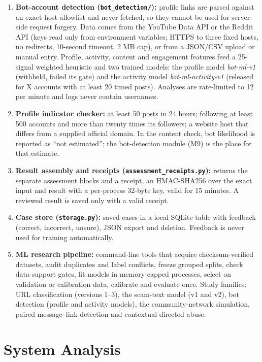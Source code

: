 \begin{enumerate}[label=\textbf{M\arabic*}, leftmargin=1.2cm]
\item \textbf{Bot-account detection (\texttt{bot\_detection/}):} profile links are parsed against an exact host allowlist and never fetched, so they cannot be used for server-side request forgery. Data comes from the YouTube Data API or the Reddit API (keys read only from environment variables; HTTPS to three fixed hosts, no redirects, 10-second timeout, 2 MB cap), or from a JSON/CSV upload or manual entry. Profile, activity, content and engagement features feed a 25-signal weighted heuristic and two trained models: the profile model \emph{bot-ml-v1} (withheld, failed its gate) and the activity model \emph{bot-ml-activity-v1} (released for X accounts with at least 20 timed posts). Analyses are rate-limited to 12 per minute and logs never contain usernames.
\item \textbf{Profile indicator checker:} at least 50 posts in 24 hours; following at least 500 accounts and more than twenty times its followers; a website host that differs from a supplied official domain. In the content check, bot likelihood is reported as ``not estimated''; the bot-detection module (M9) is the place for that estimate.
\item \textbf{Result assembly and receipts (\texttt{assessment\_receipts.py}):} returns the separate assessment blocks and a receipt, an HMAC-SHA256 \cite{hmac} over the exact input and result with a per-process 32-byte key, valid for 15 minutes. A reviewed result is saved only with a valid receipt.
\item \textbf{Case store (\texttt{storage.py}):} saved cases in a local SQLite table with feedback (correct, incorrect, unsure), JSON export and deletion. Feedback is never used for training automatically.
\item \textbf{ML research pipeline:} command-line tools that acquire checksum-verified datasets, audit duplicates and label conflicts, freeze grouped splits, check data-support gates, fit models in memory-capped processes, select on validation or calibration data, calibrate and evaluate once. Study families: URL classification (versions 1--3), the scam-text model (v1 and v2), bot detection (profile and activity models), the community-network simulation, paired message--link detection and contextual directed abuse.
\end{enumerate}

\section{System Analysis}
